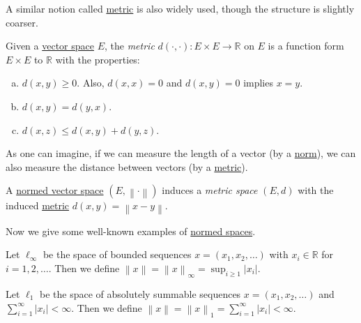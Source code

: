 A similar notion called \hyperref[prev:metric]{metric} is also widely used, though the structure is slightly coarser.

\begin{prev}[Metric]\label{prev:metric}
	Given a \hyperref[def:linear-vector-space]{vector space} \(E\), the \emph{metric} \(d(\cdot, \cdot)\colon E\times E\to \mathbb{R} \) on \(E\) is a function form \(E\times E\) to \(\mathbb{R} \) with the properties:
	\begin{enumerate}[(a)]
		\item \(d(x, y) \geq 0\). Also, \(d(x, x) = 0\) and \(d(x, y) = 0\) implies \(x = y\).
		\item \(d(x, y) = d(y, x)\).
		\item \(d(x, z) \leq d(x, y) + d(y, z)\).
	\end{enumerate}
\end{prev}

As one can imagine, if we can measure the length of a vector (by a \hyperref[def:norm]{norm}), we can also measure the distance between vectors (by a \hyperref[prev:metric]{metric}).

\begin{remark}
	A \hyperref[def:normed-vector-space]{normed vector space} \((E, \left\lVert \cdot\right\rVert )\) induces a \emph{metric space} \((E, d)\) with the induced \hyperref[prev:metric]{metric} \(d(x, y) = \left\lVert x- y\right\rVert \).
\end{remark}

Now we give some well-known examples of \hyperref[def:normed-vector-space]{normed spaces}.

\begin{eg}
	Let \(\ell _\infty \) be the space of bounded sequences \(x = (x_1, x_2, \dots )\) with \(x_i\in \mathbb{R} \) for \(i = 1, 2, \dots \). Then we define \(\left\lVert x\right\rVert = \left\lVert x\right\rVert _\infty = \sup _{i \geq 1}\left\vert x_i \right\vert \).
\end{eg}

\begin{eg}
	Let \(\ell _1\) be the space of absolutely summable sequences \(x = (x_1, x_2, \dots)\) and \(\sum_{i=1}^{\infty} \left\vert x_i \right\vert < \infty\). Then we define \(\left\lVert x\right\rVert = \left\lVert x\right\rVert _1 = \sum_{i=1}^{\infty} \left\vert x_i \right\vert < \infty\).
\end{eg}

